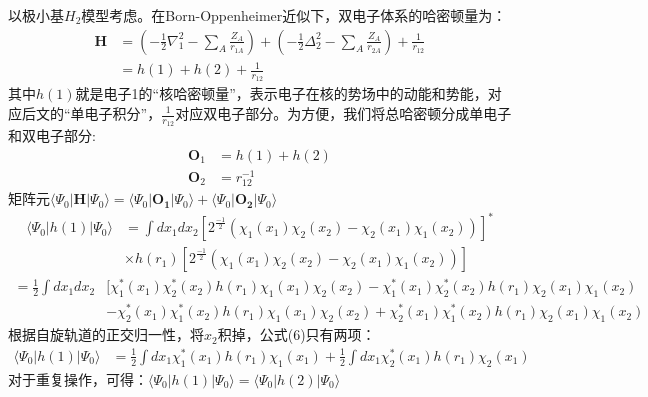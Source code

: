 \documentclass[12pt, a4paper, oneside]{ctexart}
\begin{document}
以极小基$H_2$模型考虑。在Born-Oppenheimer近似下，双电子体系的哈密顿量为：
\begin{equation}
\begin{aligned}
	\mathbf{H}&= \left(-\frac12\nabla_1^2-\sum_A\frac{Z_A}{r_{1A}}\right)+\left(-\frac12\Delta_2^2-\sum_A\frac{Z_A}{r_{2A}}\right)+\frac{1}{r_{12}}\\
			  &=h(1)+h(2)+\frac{1}{r_{12}}
\end{aligned}
\end{equation}
其中$h(1)$就是电子1的“核哈密顿量”，表示电子在核的势场中的动能和势能，对应后文的“单电子积分”，$\frac{1}{r_{12}}$对应双电子部分。为方便，我们将总哈密顿分成单电子和双电子部分:
\begin{equation}
\begin{aligned}
	\mathbf{O}_1&=h(1)+h(2)\\
	\mathbf{O}_2&=r_{12}^{-1}
\end{aligned}
\end{equation}
矩阵元$\langle\Psi_0|\mathbf{H}|\Psi_0\rangle=\langle\Psi_0|\mathbf{O_1}|\Psi_0\rangle+\langle\Psi_0|\mathbf{O_2}|\Psi_0\rangle$
\begin{equation}
\begin{aligned}
\langle\Psi_0|h(1)|\Psi_0\rangle&=\int dx_1dx_2[2^{\frac{-1}{2}}(\chi_1(x_1)\chi_2(x_2)-\chi_2(x_1)\chi_1(x_2))]^*\\
								&\times h(r_1)[2^{\frac{-1}{2}}(\chi_1(x_1)\chi_2(x_2)-\chi_2(x_1)\chi_1(x_2))]
\end{aligned}
\end{equation}
\begin{equation}
\begin{aligned}
=\frac12\int dx_1dx_2&[\chi_1^*(x_1)\chi_2^*(x_2)h(r_1)\chi_1(x_1)\chi_2(x_2)-\chi_1^*(x_1)\chi_2^*(x_2)h(r_1)\chi_2(x_1)\chi_1(x_2)\\
&-\chi_2^*(x_1)\chi_1^*(x_2)h(r_1)\chi_1(x_1)\chi_2(x_2)+\chi_2^*(x_1)\chi_1^*(x_2)h(r_1)\chi_2(x_1)\chi_1(x_2)
\end{aligned}
\end{equation}
根据自旋轨道的正交归一性，将$x_2$积掉，公式(6)只有两项：
\begin{equation}
\begin{aligned}
\langle\Psi_0|h(1)|\Psi_0\rangle&=\frac12\int dx_1\chi_1^*(x_1)h(r_1)\chi_1(x_1)+\frac12\int dx_1\chi_2^*(x_1)h(r_1)\chi_2(x_1)
\end{aligned}
\end{equation}
对于重复操作，可得：$\langle\Psi_0|h(1)|\Psi_0\rangle=\langle\Psi_0|h(2)|\Psi_0\rangle$
\end{document}

